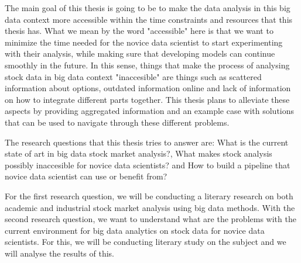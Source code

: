 The main goal of this thesis is going to be to make the data analysis in this big data context more accessible within the time constraints and resources that this thesis has.
What we mean by the word "accessible" here is that we want to minimize the time needed for the novice data scientist to start experimenting with their analysis, while making sure that developing models can continue smoothly in the future.
In this sense, things that make the process of analysing stock data in big data context "inaccesible" are things such as scattered information about options, outdated information online and lack of information on how to integrate different parts together.
This thesis plans to alleviate these aspects by providing aggregated information and an example case with solutions that can be used to navigate through these different problems.



The research questions that this thesis tries to answer are: What is the current state of art in big data stock market analysis?, What makes stock analysis possibly inaccesible for novice data scientists? and How to build a pipeline that novice data scientist can use or benefit from?

For the first research question, we will be conducting a literary research on both academic and industrial stock market analysis using big data methods.
With the second research question, we want to understand what are the problems with the current environment for big data analytics on stock data for novice data scientists.
For this, we will be conducting literary study on the subject and we will analyse the results of this.

